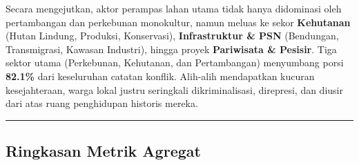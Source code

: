 \documentclass[
]{article}
\begin{document}
Secara mengejutkan, aktor perampas lahan utama tidak hanya didominasi
oleh pertambangan dan perkebunan monokultur, namun meluas ke sekor
\textbf{Kehutanan} (Hutan Lindung, Produksi, Konservasi),
\textbf{Infrastruktur \& PSN} (Bendungan, Transmigrasi, Kawasan
Industri), hingga proyek \textbf{Pariwisata \& Pesisir}. Tiga sektor
utama (Perkebunan, Kehutanan, dan Pertambangan) menyumbang porsi
\textbf{82.1\%} dari keseluruhan catatan konflik. Alih-alih mendapatkan
kucuran kesejahteraan, warga lokal justru seringkali dikriminalisasi,
direpresi, dan diusir dari atas ruang penghidupan historis mereka.

\begin{center}\rule{0.5\linewidth}{0.5pt}\end{center}

\subsection{Ringkasan Metrik Agregat}\label{ringkasan-metrik-agregat}
\end{document}
